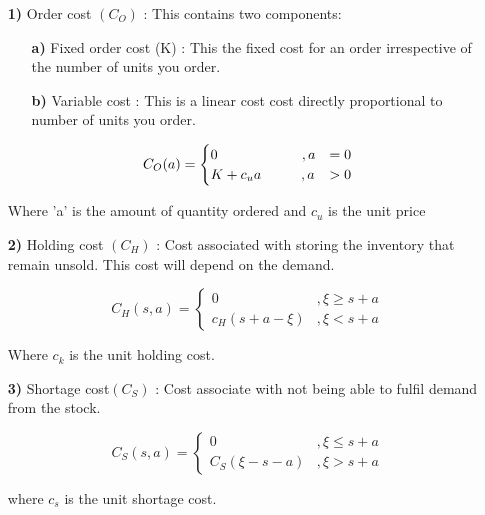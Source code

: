 \documentclass[12pt,a4paper,oneside]{report}
\begin{document}
\begin{enumerate}
\item[\textbf{1)}] Order cost $(C_O)$ : This contains two components:
\begin{enumerate}
\item[\textbf{a)}] Fixed order cost (K) : This the fixed cost for an order irrespective of the number of units you order.
\item[\textbf{b)}] Variable cost : This is a linear cost cost directly proportional to number of units you order.\\
\end{enumerate}
\begin{equation*}
C_O(a) = 
\begin{cases}
0   \hspace{2.12cm}          ,a&=0\\
K+ c_u {a}     \hspace{1cm}           ,a&>0
\end{cases}
\end{equation*}

\hspace{6mm} Where 'a' is the amount of quantity ordered and $c_u$  is the unit price

\item[\textbf{2)}]Holding cost $(C_H)$ : Cost associated with storing the inventory that remain unsold. This cost will depend on the demand.

\begin{equation*}
C_H(s,a) = 
\begin{cases}
0   &,\xi \geq s+a\\
c_H(s+a-\xi)     & ,\xi <s+a
\end{cases}
\end{equation*}
\begin{flushleft}Where $c_k$ is the unit holding cost.
\end{flushleft}

\item[\textbf{3)}]	Shortage cost$(C_S)$ : Cost associate with not being able to fulfil demand from the stock. 

\begin{equation*}
C_S(s,a) = 
\begin{cases}
0          &,\xi \leq s+a\\
C_S(\xi-s-a)     &  ,\xi >s+a
\end{cases}
\end{equation*}
\begin{flushleft}where $c_s$ is the unit shortage cost.
\end{flushleft}
\end{enumerate}
\end{document}
